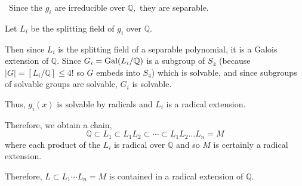 \documentclass[12pt]{AlgebraQual}
\begin{document}
\begin{solution}$\,$
Since the $g_i$ are irreducible over $\mathbb{Q},$ they are separable.

Let $L_i$ be the splitting field of $g_i$ over $\mathbb{Q}$.

Then since $L_i$ is the splitting field of a separable polynomial, it is a Galois extension of $\mathbb{Q}$. Since $G_i=\text{Gal}(L_i/\mathbb{Q})$ is a subgroup of $S_4$ (because $|G|=[L_i/\mathbb{Q}]\le 4!$ so $G$ embeds into $S_4$) which is solvable, and since subgroups of solvable groups are solvable, $G_i$ is solvable.

Thus, $g_i(x)$ is solvable by radicals and $L_i$ is a radical extension.

Therefore, we obtain a chain, $$\mathbb{Q}\subset L_1\subset L_1L_2\subset\cdots\subset L_1L_2\dots L_n=M$$ where each product of the $L_i$ is radical over $\mathbb{Q}$ and so $M$ is certainly a radical extension.

Therefore, $L\subset L_1\cdots L_n=M$ is contained in a radical extension of $\mathbb{Q}.$
\end{solution}
\end{document}
